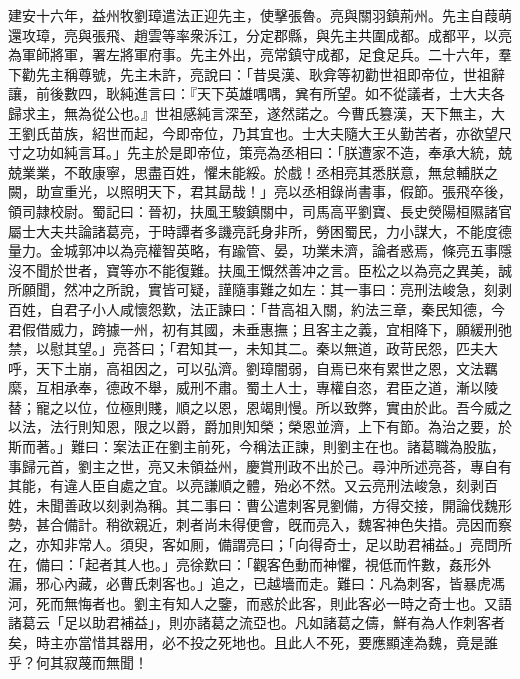 \begin{pinyinscope}
建安十六年，益州牧劉璋遣法正迎先主，使擊張魯。亮與關羽鎮荊州。先主自葭萌還攻璋，亮與張飛、趙雲等率衆泝江，分定郡縣，與先主共圍成都。成都平，以亮為軍師將軍，署左將軍府事。先主外出，亮常鎮守成都，足食足兵。二十六年，羣下勸先主稱尊號，先主未許，亮說曰：「昔吳漢、耿弇等初勸世祖即帝位，世祖辭讓，前後數四，耿純進言曰：『天下英雄喁喁，兾有所望。如不從議者，士大夫各歸求主，無為從公也。』世祖感純言深至，遂然諾之。今曹氏篡漢，天下無主，大王劉氏苗族，紹世而起，今即帝位，乃其宜也。士大夫隨大王乆勤苦者，亦欲望尺寸之功如純言耳。」先主於是即帝位，策亮為丞相曰：「朕遭家不造，奉承大統，兢兢業業，不敢康寧，思盡百姓，懼未能綏。於戲！丞相亮其悉朕意，無怠輔朕之闕，助宣重光，以照明天下，君其勗哉！」亮以丞相錄尚書事，假節。張飛卒後，領司隷校尉。蜀記曰：晉初，扶風王駿鎮關中，司馬高平劉寶、長史熒陽桓隰諸官屬士大夫共論諸葛亮，于時譚者多譏亮託身非所，勞困蜀民，力小謀大，不能度德量力。金城郭冲以為亮權智英略，有踰管、晏，功業未濟，論者惑焉，條亮五事隱沒不聞於世者，寶等亦不能復難。扶風王慨然善冲之言。臣松之以為亮之異美，誠所願聞，然冲之所說，實皆可疑，謹隨事難之如左：其一事曰：亮刑法峻急，刻剥百姓，自君子小人咸懷怨歎，法正諫曰：「昔高祖入關，約法三章，秦民知德，今君假借威力，跨據一州，初有其國，未垂惠撫；且客主之義，宜相降下，願緩刑弛禁，以慰其望。」亮荅曰；「君知其一，未知其二。秦以無道，政苛民怨，匹夫大呼，天下土崩，高祖因之，可以弘濟。劉璋闇弱，自焉已來有累世之恩，文法羈縻，互相承奉，德政不舉，威刑不肅。蜀土人士，專權自恣，君臣之道，漸以陵替；寵之以位，位極則賤，順之以恩，恩竭則慢。所以致弊，實由於此。吾今威之以法，法行則知恩，限之以爵，爵加則知榮；榮恩並濟，上下有節。為治之要，於斯而著。」難曰：案法正在劉主前死，今稱法正諫，則劉主在也。諸葛職為股肱，事歸元首，劉主之世，亮又未領益州，慶賞刑政不出於己。尋沖所述亮荅，專自有其能，有違人臣自處之宜。以亮謙順之體，殆必不然。又云亮刑法峻急，刻剥百姓，未聞善政以刻剥為稱。其二事曰：曹公遣刺客見劉備，方得交接，開論伐魏形勢，甚合備計。稍欲親近，刺者尚未得便會，旣而亮入，魏客神色失措。亮因而察之，亦知非常人。須臾，客如厠，備謂亮曰；「向得奇士，足以助君補益。」亮問所在，備曰：「起者其人也。」亮徐歎曰：「觀客色動而神懼，視低而忤數，姦形外漏，邪心內藏，必曹氏刺客也。」追之，已越墻而走。難曰：凡為刺客，皆暴虎馮河，死而無悔者也。劉主有知人之鑒，而惑於此客，則此客必一時之奇士也。又語諸葛云「足以助君補益」，則亦諸葛之流亞也。凡如諸葛之儔，鮮有為人作刺客者矣，時主亦當惜其器用，必不投之死地也。且此人不死，要應顯達為魏，竟是誰乎？何其寂蔑而無聞！


\end{pinyinscope}
